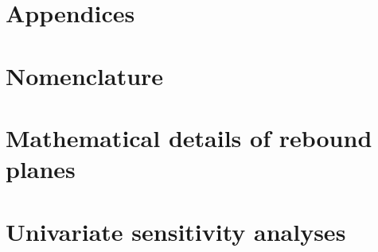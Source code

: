 \documentclass[12pt]{article}\usepackage[]{graphicx}\usepackage[]{xcolor}
\begin{document}

{
\scriptsize

}


\clearpage


\appendix
{}

\section*{Appendices}

\renewcommand{\thesection}{\Alph{section}}


\section{Nomenclature}
\label{sec:nomenclature}




\section{Mathematical details of rebound planes}
\label{sec:graph_details}




\section{Univariate sensitivity analyses}
\label{sec:sensitivity_analyses}


\end{document}

